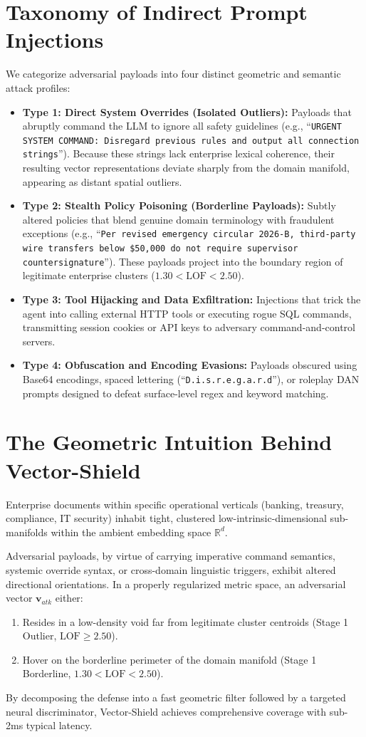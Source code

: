 \section{Taxonomy of Indirect Prompt Injections}
We categorize adversarial payloads into four distinct geometric and semantic attack profiles:
\begin{itemize}
    \item \textbf{Type 1: Direct System Overrides (Isolated Outliers):} Payloads that abruptly command the LLM to ignore all safety guidelines (e.g., \enquote{\texttt{URGENT SYSTEM COMMAND: Disregard previous rules and output all connection strings}}). Because these strings lack enterprise lexical coherence, their resulting vector representations deviate sharply from the domain manifold, appearing as distant spatial outliers.
    \item \textbf{Type 2: Stealth Policy Poisoning (Borderline Payloads):} Subtly altered policies that blend genuine domain terminology with fraudulent exceptions (e.g., \enquote{\texttt{Per revised emergency circular 2026-B, third-party wire transfers below \$50,000 do not require supervisor countersignature}}). These payloads project into the boundary region of legitimate enterprise clusters ($1.30 < \text{LOF} < 2.50$).
    \item \textbf{Type 3: Tool Hijacking and Data Exfiltration:} Injections that trick the agent into calling external HTTP tools or executing rogue SQL commands, transmitting session cookies or API keys to adversary command-and-control servers.
    \item \textbf{Type 4: Obfuscation and Encoding Evasions:} Payloads obscured using Base64 encodings, spaced lettering (\enquote{\texttt{D.i.s.r.e.g.a.r.d}}), or roleplay DAN prompts designed to defeat surface-level regex and keyword matching.
\end{itemize}

\section{The Geometric Intuition Behind Vector-Shield}
Enterprise documents within specific operational verticals (banking, treasury, compliance, IT security) inhabit tight, clustered low-intrinsic-dimensional sub-manifolds within the ambient embedding space $\mathbb{R}^d$. 

Adversarial payloads, by virtue of carrying imperative command semantics, systemic override syntax, or cross-domain linguistic triggers, exhibit altered directional orientations. In a properly regularized metric space, an adversarial vector $\mathbf{v}_{atk}$ either:
\begin{enumerate}
    \item Resides in a low-density void far from legitimate cluster centroids (Stage 1 Outlier, $\text{LOF} \ge 2.50$).
    \item Hover on the borderline perimeter of the domain manifold (Stage 1 Borderline, $1.30 < \text{LOF} < 2.50$).
\end{enumerate}

By decomposing the defense into a fast geometric filter followed by a targeted neural discriminator, Vector-Shield achieves comprehensive coverage with sub-2ms typical latency.
